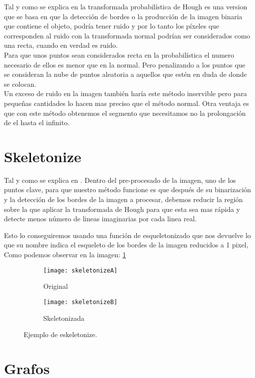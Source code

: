Tal y como se explica en \cite{Kiryati20001157} la transformada probabilística de Hough es una version que se basa en que la detección de bordes o la producción de la imagen binaria que contiene el objeto, podría tener ruido y por lo tanto los píxeles que corresponden al ruido con la transformada normal podrían ser considerados como una recta, cuando en verdad es ruido.\\
Para que unos puntos sean considerados recta en la probabilística el numero necesario de ellos es menor que en la normal. Pero penalizando a los puntos que se consideran la nube de puntos aleatoria a aquellos que estén en duda de donde se colocan.\\
Un exceso de ruido en la imagen también haría este método inservible pero para pequeñas cantidades lo hacen mas preciso que el método normal.
Otra ventaja es que con este método obtenemos el segmento que necesitamos no la prolongación de el hasta el infinito.

\section{Skeletonize }
Tal y como se explica en \cite{scik:skeleton}. Dentro del pre-procesado de la imagen, uno de los puntos clave, para que nuestro método funcione es que después de su binarización y la detección de los bordes de la imagen a procesar, debemos reducir la región sobre la que aplicar la transformada de Hough para que esta sea mas rápida y detecte menos número de lineas imaginarias por cada linea real.

Esto lo conseguiremos usando una función de esqueletonizado que nos devuelve lo que su nombre indica el esqueleto de los bordes de la imagen reducidos a 1 pixel, Como podemos observar en la imagen: \ref{fig:3.6}


\begin{figure}
\begin{subfigure}[b]{.5\linewidth}
\centering\large \texttt{[image: skeletonizeA]}
\caption{Original}
\end{subfigure}%
\begin{subfigure}[b]{.5\linewidth}
\centering\large \texttt{[image: skeletonizeB]}
\caption{Skeletonizada}
\end{subfigure}
\caption{Ejemplo de eskeletonize.}\label{fig:3.6}
\end{figure}


\section{Grafos}	

